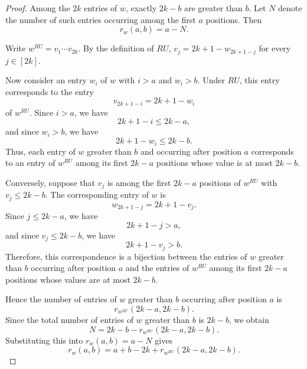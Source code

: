 \documentclass[12pt]{amsart}
\theoremstyle{definition}
\numberwithin{equation}{section}
\begin{document}
\begin{proof}
Among the $2k$ entries of $w$, exactly $2k-b$ are greater than $b$.
Let $N$ denote the number of such entries occurring among the first
$a$ positions. Then
\begin{equation*}
r_w(a,b)=a-N.
\end{equation*}

Write
$w^{RU}=v_1\cdots v_{2k}$.
By the definition of $RU$,
$v_j=2k+1-w_{2k+1-j}$
for every $j\in[2k]$.

Now consider an entry $w_i$ of $w$ with $i>a$ and $w_i>b$.
Under $RU$, this entry corresponds to the entry
\begin{equation*}
v_{2k+1-i}=2k+1-w_i
\end{equation*}
of $w^{RU}$. Since $i>a$, we have
\begin{equation*}
2k+1-i\leq 2k-a,
\end{equation*}
and since $w_i>b$, we have
\begin{equation*}
2k+1-w_i\leq 2k-b.
\end{equation*}
Thus, each entry of $w$ greater than $b$ and occurring after position
$a$ corresponds to an entry of $w^{RU}$ among its first $2k-a$
positions whose value is at most $2k-b$.

Conversely, suppose that $v_j$ is among the first $2k-a$ positions of
$w^{RU}$ with $v_j\leq 2k-b$. The corresponding entry of $w$
is
\begin{equation*}
w_{2k+1-j}=2k+1-v_j.
\end{equation*}
Since $j\leq 2k-a$, we have
\begin{equation*}
2k+1-j>a,
\end{equation*}
and since $v_j\leq 2k-b$, we have
\begin{equation*}
2k+1-v_j>b.
\end{equation*}
Therefore, this correspondence is a bijection between the entries of
$w$ greater than $b$ occurring after position $a$ and the entries of
$w^{RU}$ among its first $2k-a$ positions whose values are at most
$2k-b$.

Hence the number of entries of $w$ greater than $b$ occurring after
position $a$ is
\begin{equation*}
r_{w^{RU}}(2k-a,2k-b).
\end{equation*}
Since the total number of entries of $w$ greater than $b$ is $2k-b$,
we obtain
\begin{equation*}
N
=
2k-b-r_{w^{RU}}(2k-a,2k-b).
\end{equation*}
Substituting this into $r_w(a,b)=a-N$ gives
\begin{equation*}
r_w(a,b)=
a+b-2k+r_{w^{RU}}(2k-a,2k-b).
\end{equation*}
\end{proof}
\end{document}
